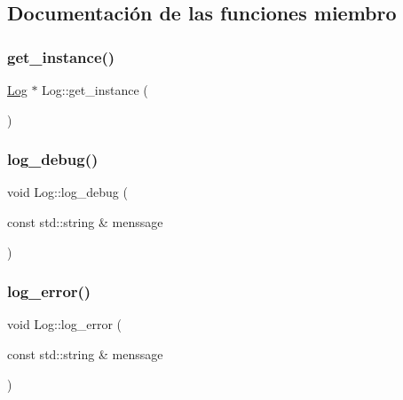 \subsection{Documentación de las funciones miembro}
\mbox{\label{classLog_a5046d929af7ff9a206279f2cd9e9d8e8}} 
\subsubsection{\texorpdfstring{get\+\_\+instance()}{get\_instance()}}
{\footnotesize\ttfamily \hyperlink{classLog}{Log} $\ast$ Log\+::get\+\_\+instance (\begin{DoxyParamCaption}{ }\end{DoxyParamCaption})\hspace{0.3cm}{\ttfamily [static]}}

\mbox{\label{classLog_a7ed913c04040b6ff20da0bd7306b92cd}} 
\subsubsection{\texorpdfstring{log\+\_\+debug()}{log\_debug()}}
{\footnotesize\ttfamily void Log\+::log\+\_\+debug (\begin{DoxyParamCaption}\item[{const std\+::string \&}]{menssage }\end{DoxyParamCaption})}

\mbox{\label{classLog_a336032c9a87f2a6b0a463db7e2f7d1a4}} 
\subsubsection{\texorpdfstring{log\+\_\+error()}{log\_error()}}
{\footnotesize\ttfamily void Log\+::log\+\_\+error (\begin{DoxyParamCaption}\item[{const std\+::string \&}]{menssage }\end{DoxyParamCaption})}

\mbox{\label{classLog_a9af02d242cf75e658899c67ad9136fd7}} 
